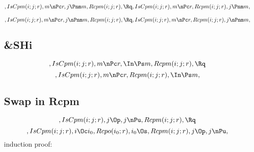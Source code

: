 \[, IsCpm(i;j;r), m \nPc r, j \Pnm m, Rcpm(i;j;r), \Rq , IsCpm(i;j;r), m \nPc r, Rcpm(i;j;r), j \Pnm m,\]

\[, IsCpm(i;j;r), m \nPc r, j \nPnm m, Rcpm(i;j;r), \Rq , IsCpm(i;j;r), m \nPc r, Rcpm(i;j;r), j \nPnm m,\]



\bigskip
\bigskip
\subsection{&SHi}
\[, IsCpm(i;j;r), m \nPc r, \In \Ps m, Rcpm(i;j;r), \Rq \]
\[, IsCpm(i;j;r), m \nPc r, Rcpm(i;j;r), \In \Ps m, \]



\bigskip
\bigskip
\subsection{ Swap in Rcpm}
\[, IsCpm(i;j;r), j \Op, j \nPu, Rcpm(i;j;r), \Rq \]
\[, IsCpm(i;j;r), i \Oc i_0, Rcpo(i_0;r), i_0 \Os, Rcpm(i;j;r), j \Op, j \nPu, \]
induction \; proof:\\
